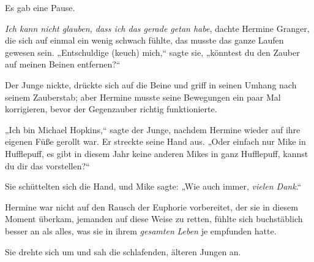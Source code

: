 Es gab eine Pause.

\emph{Ich kann nicht glauben, dass ich das gerade getan habe}, dachte Hermine Granger, die sich auf einmal ein wenig schwach fühlte, das musste das ganze Laufen gewesen sein. „Entschuldige (keuch) mich,“ sagte sie, „könntest du den Zauber auf meinen Beinen entfernen?“

Der Junge nickte, drückte sich auf die Beine und griff in seinen Umhang nach seinem Zauberstab; aber Hermine musste seine Bewegungen ein paar Mal korrigieren, bevor der Gegenzauber richtig funktionierte.

„Ich bin Michael Hopkins,“ sagte der Junge, nachdem Hermine wieder auf ihre eigenen Füße gerollt war. Er streckte seine Hand aus. „Oder einfach nur Mike in Hufflepuff, es gibt in diesem Jahr keine anderen Mikes in ganz Hufflepuff, kannst du dir das vorstellen?“

Sie schüttelten sich die Hand, und Mike sagte: „Wie auch immer, \emph{vielen Dank}.“

Hermine war nicht auf den Rausch der Euphorie vorbereitet, der sie in diesem Moment überkam, jemanden auf diese Weise zu retten, fühlte sich buchstäblich besser an als alles, was sie in ihrem \emph{gesamten} \emph{Leben} je empfunden hatte.

Sie drehte sich um und sah die schlafenden, älteren Jungen an.

